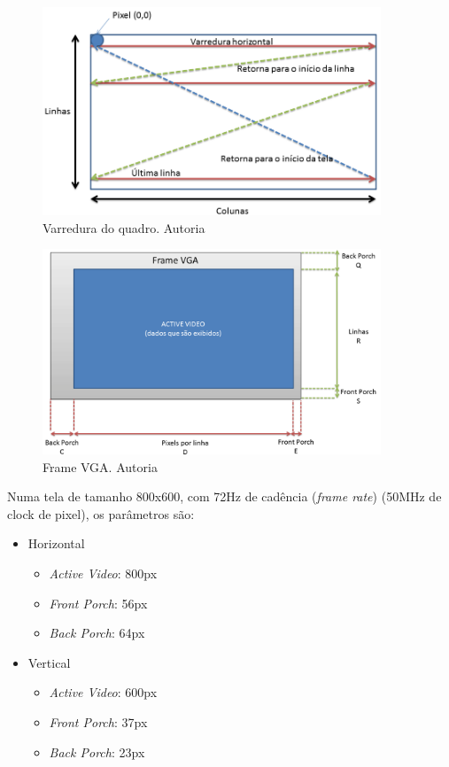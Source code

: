 \documentclass[12pt]{article}
\begin{document}
\clearpage

\begin{figure}[!h]
    \centering
    \includegraphics[width=0.9\textwidth]{img/controlador-vga-varredura-quadro-vga.png}
    \caption{Varredura do quadro. Autoria \cite{vga-sync}}
    \label{fig:vga-varredura}
\end{figure}

\begin{figure}[!h]
    \centering
    \includegraphics[width=0.9\textwidth]{img/controlador-vga-frame-vga.png}
    \caption{Frame VGA. Autoria \cite{vga-sync}}
    \label{fig:vga-frame}
\end{figure}

Numa tela de tamanho 800x600, com 72Hz de cadência (\emph{frame rate}) (50MHz de clock de pixel), os parâmetros são:

\begin{itemize}
    \item Horizontal
    \begin{itemize}
        \item \emph{Active Video}: 800px
        \item \emph{Front Porch}: 56px
        \item \emph{Back Porch}: 64px 
    \end{itemize}
    \item Vertical
    \begin{itemize}
        \item \emph{Active Video}: 600px
        \item \emph{Front Porch}: 37px
        \item \emph{Back Porch}: 23px
    \end{itemize}
\end{itemize}
\end{document}
